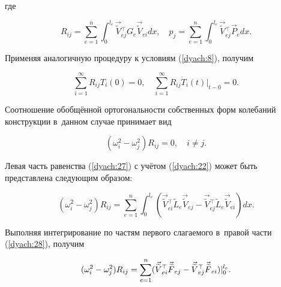 где

$$

R_{ij}=\sum\limits_{e=1}^{n}\int_{0}^{l_{e}}\vec{\widetilde{V}}{}_{ej}^{\top}G_{e}\vec{\widetilde{V}}{}_{ei}dx, \quad

p_{j}=\sum\limits_{e=1}^{n}\int_{0}^{l_{e}}\vec{\widetilde{V}}{}_{ej}^{\top}\vec{P}_{e}dx.

$$

Применяя аналогичную процедуру к условиям (\ref{dyach:8}), получим

\begin{equation}

\label{dyach:26}

\sum\limits_{i=1}^{\infty}R_{ij}T_{i}(0)=0, \quad \sum\limits_{i=1}^{\infty}R_{ij} \dot{T}_{i}(t)\big|_{t-0}=0.

\end{equation}

Соотношение обобщённой ортогональности собственных форм колебаний конструкции в~данном случае принимает вид

\begin{equation}

\label{dyach:27}

(\omega_{i}^{2}-\omega_{j}^{2})R_{ij}=0, \quad i\neq j.

\end{equation}



Левая часть равенства (\ref{dyach:27}) с учётом (\ref{dyach:22}) может быть представлена следующим образом:

\begin{equation}

\label{dyach:28}

(\omega_{i}^{2}-\omega_{j}^{2})R_{ij}=

\sum\limits_{e=1}^{n}\int_{0}^{l_{e}}(\vec{\widetilde{V}}{}_{ei}^{\top}

\widetilde{L}_{e}\vec{\widetilde{V}}{}_{ej}-\vec{\widetilde{V}}{}_{ej}^{\top}\widetilde{L}_{e}\vec{\widetilde{V}}{}_{ei})dx.

\end{equation}

Выполняя интегрирование по частям первого слагаемого в~правой части (\ref{dyach:28}), получим

\begin{equation}

\notag

(\omega_{i}^{2}-\omega_{j}^{2})R_{ij}=\sum\limits_{e=1}^{n}(\vec{\widetilde{V}}{}_{ei}^{\top}\vec{\widetilde{F}}_{ej}-

\vec{\widetilde{V}}{}_{ej}^{\top}\vec{\widetilde{F}}_{ei})|_{0}^{l_{e}}.

\end{equation}

